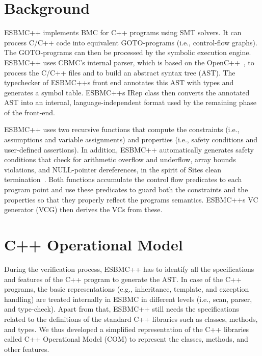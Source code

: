 \documentclass[a4paper]{llncs}
\begin{document}
\section{Background}

ESBMC++ implements BMC for C++ programs using SMT solvers. 
It can process C/C++ code into equivalent GOTO-programs 
(i.e., control-flow graphs). The GOTO-programs can then be 
processed by the symbolic execution engine. ESBMC++ uses CBMC's 
internal parser, which is based on the OpenC++~\cite{OpenCpp12}, 
to process the C/C++ files and to build an abstract syntax tree (AST). 
The typechecker of ESBMC++s front end annotates this AST with types and 
generates a symbol table. ESBMC++s IRep class then converts the annotated 
AST into an internal, language-independent format used by the remaining phase 
of the front-end.

ESBMC++ uses two recursive functions that compute the
constraints (i.e., assumptions and variable assignments) and
properties (i.e., safety conditions and user-defined assertions).
In addition, ESBMC++ automatically generates safety
conditions that check for arithmetic overflow and underflow,
array bounds violations, and NULL-pointer dereferences,
in the spirit of Sites clean termination~\cite{Sites74}. Both
functions accumulate the control flow predicates to each
program point and use these predicates to guard both the
constraints and the properties so that they properly reflect
the programs semantics. ESBMC++s VC generator (VCG) then
derives the VCs from these.

\section{C++ Operational Model}

During the verification process, ESBMC++ has to identify all the 
specifications and features of the C++ program to generate the AST. 
In case of the C++ programs, the basic representations (e.g., inheritance, 
template, and exception handling) are treated internally in ESBMC in different 
levels (i.e., scan, parser, and type-check). Apart from that, ESBMC++ still needs 
the specifications related to the definitions of the standard C++ libraries 
such as classes, methods, and types. We thus developed a simplified representation 
of the C++ libraries called C++ Operational Model (COM) to represent the classes, 
methods, and other features.
\end{document}
